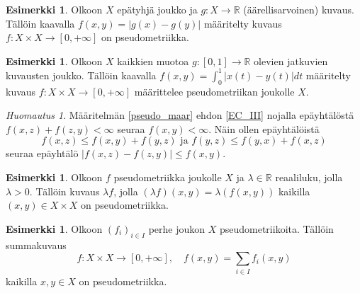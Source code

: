 \documentclass[12pt,a4paper,leqno]{report}
\newcommand{\R}{\mathbb{R}}
\theoremstyle{plain}
\theoremstyle{definition}
\newtheorem{esim}[equation]{Esimerkki}
\theoremstyle{remark}
\newtheorem{huom}[equation]{Huomautus}
\begin{document}
\begin{esim}%
Olkoon $X$ epätyhjä joukko ja $g\colon X\rightarrow \R$ (äärellisarvoinen) kuvaus. Tällöin kaavalla $f(x,y)=|g(x)-g(y)|$ määritelty kuvaus $f\colon X\times X\rightarrow[0,+\infty]$ on pseudometriikka.
\end{esim}
\begin{esim}%
Olkoon $X$ kaikkien muotoa $g\colon [0,1]\rightarrow \R$ olevien jatkuvien kuvausten joukko. %
Tällöin kaavalla $f(x,y)=\int_0^1 |x(t)-y(t)|dt$ määritelty kuvaus $f\colon X\times X\rightarrow [0,+\infty]$ määrittelee pseudometriikan joukolle $X$.
\end{esim}
\begin{huom}
Määritelmän \ref{pseudo_maar} ehdon \ref{EC_III} nojalla epäyhtälöstä $f(x,z)+f(z,y)<\infty$ seuraa $f(x,y)<\infty$. 
Näin ollen epäyhtälöistä 
\begin{equation*}
f(x,z)\leq f(x,y)+f(y,z)\text{ ja }f(y,z)\leq f(y,x)+f(x,z)
\end{equation*}
seuraa epäyhtälö $|f(x,z)-f(z,y)|\leq f(x,y)$.
\end{huom}
\begin{esim}%
Olkoon $f$ pseudometriikka joukolle $X$ ja 
$\lambda\in\R$ reaaliluku, jolla $\lambda >0$. 
Tällöin kuvaus $\lambda f$, jolla 
$(\lambda f) (x,y)=\lambda (f (x,y))$ 
kaikilla $(x,y)\in X\times X$ on pseudometriikka.
\end{esim}
\begin{esim}%
Olkoon $(f_i)_{i\in I}$ perhe joukon $X$ pseudometriikoita. 
Tällöin summakuvaus 
\begin{equation*}
f\colon X\times X\rightarrow [0,+\infty],\quad
f(x,y)=\sum_{i\in I}f_i(x,y)%
\end{equation*} 
kaikilla $x,y\in X$ 
on pseudometriikka.
\end{esim}
\end{document}
